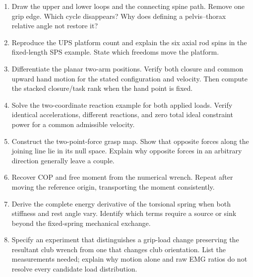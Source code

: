 \begin{enumerate}
\item Draw the upper and lower loops and the connecting spine path. Remove one
      grip edge. Which cycle disappears? Why does defining a pelvis--thorax
      relative angle not restore it?
\item Reproduce the UPS platform count and explain the six axial rod spins in
      the fixed-length SPS example. State which freedoms move the platform.
\item Differentiate the planar two-arm positions. Verify both closure and
      common upward hand motion for the stated configuration and velocity.
      Then compute the stacked closure/task rank when the hand point is fixed.
\item Solve the two-coordinate reaction example for both applied loads. Verify
      identical accelerations, different reactions, and zero total ideal
      constraint power for a common admissible velocity.
\item Construct the two-point-force grasp map. Show that opposite forces along
      the joining line lie in its null space. Explain why opposite forces in
      an arbitrary direction generally leave a couple.
\item Recover COP and free moment from the numerical wrench. Repeat after
      moving the reference origin, transporting the moment consistently.
\item Derive the complete energy derivative of the torsional spring when both
      stiffness and rest angle vary. Identify which terms require a source or
      sink beyond the fixed-spring mechanical exchange.
\item Specify an experiment that distinguishes a grip-load change preserving
      the resultant club wrench from one that changes club orientation. List
      the measurements needed; explain why motion alone and raw EMG ratios
      do not resolve every candidate load distribution.
\end{enumerate}
